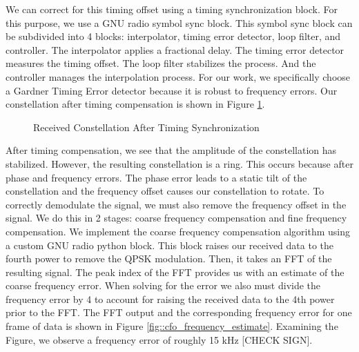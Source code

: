 \documentclass[conference,onecolumn]{IEEEtran}
\begin{document}
We can correct for this timing offset using a timing synchronization block. For this purpose, we use a GNU radio symbol sync block. This symbol sync block can be subdivided into 4 blocks: interpolator, timing error detector, loop filter, and controller. The interpolator applies a fractional delay. The timing error detector measures the timing offset. The loop filter stabilizes the process. And the controller manages the interpolation process. For our work, we specifically choose a Gardner Timing Error detector because it is robust to frequency errors. Our constellation after timing compensation is shown in Figure \ref{fig::constellation_after_timing_comp}.

\begin{figure}[H]
	\centerline{}
	\caption{Received Constellation After Timing Synchronization}
	\label{fig::constellation_after_timing_comp}
\end{figure}

After timing compensation, we see that the amplitude of the constellation has stabilized. However, the resulting constellation is a ring. This occurs because after phase and frequency errors. The phase error leads to a static tilt of the constellation and the frequency offset causes our constellation to rotate. To correctly demodulate the signal, we must also remove the frequency offset in the signal. We do this in 2 stages: coarse frequency compensation and fine frequency compensation. We implement the coarse frequency compensation algorithm using a custom GNU radio python block. This block raises our received data to the fourth power to remove the QPSK modulation. Then, it takes an FFT of the resulting signal. The peak index of the FFT provides us with an estimate of the coarse frequency error. When solving for the error we also must divide the frequency error by 4 to account for raising the received data to the 4th power prior to the FFT. The FFT output and the corresponding frequency error for one frame of data is shown in Figure \ref{fig::cfo_frequency_estimate}. Examining the Figure, we observe a frequency error of roughly 15 kHz [CHECK SIGN].
\end{document}
